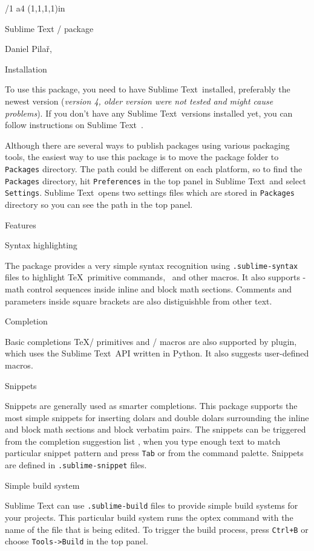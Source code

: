 \fontfam[Termes]

\typosize[11/13]
\margins/1 a4 (1,1,1,1)in
\enlang
\nopagenumbers

\hyperlinks \Blue \Blue


\def\subl{Sublime Text}


\tit Sublime Text \OpTeX/ package

\hfil Daniel Pilař, \the\year \hfil


\nonum\sec Installation

To use this package, you need to have \subl\ installed, preferably the newest version
({\it version 4, older version were not tested and might cause problems}). If you don't have any \subl\ versions installed yet,
you can follow instructions on \subl\ .  \par

Although there are several ways to publish packages using various packaging tools, the easiest way to use this package is to
move the package folder to {\tt Packages} directory. The path could be different on each platform, so to find the {\tt Packages} directory,
hit {\tt Preferences} in the top panel in \subl\ and select {\tt Settings}. \subl\ opens two settings files which are stored in {\tt Packages}
directory so you can see the path in the top panel.

\nonum\sec Features

\nonum\secc Syntax highlighting

The package provides a very simple syntax recognition using {\tt .sublime-syntax} files to highlight \TeX\ primitive commands, \OpTeX\ and
other macros. It also supports \OpTeX-math control sequences inside inline and block math sections. Comments and parameters inside square
brackets are also distiguishble from other text.

\nonum\secc Completion

Basic completions \TeX/ primitives and \OpTeX/ macros are also supported by plugin, which uses the \subl\ API written in Python. It also suggests
user-defined macros.

\nonum\secc Snippets

Snippets are generally used as smarter completions. This package supports the most simple snippets for inserting dolars and double dolars
surrounding the inline and block math sections and block verbatim pairs. The snippets can be triggered from the completion suggestion list
, when you type enough text to match particular snippet pattern and press {\tt Tab} or from the command palette. Snippets are defined in
{\tt .sublime-snippet} files.

\nonum\secc Simple build system

Sublime Text can use {\tt .sublime-build} files to provide simple build systems for your projects. This particular build system runs 
the optex command with the name of the file that is being edited. To trigger the build process, press {\tt Ctrl+B} or choose {\tt Tools->Build} in
the top panel.


